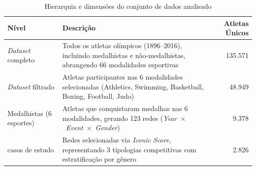 \begin{table}[htbp]
\centering
\caption{Hierarquia e dimensões do conjunto de dados analisado}
\label{tab:dataset_hierarchy}
\begin{tabular}{p{3.5cm}p{7cm}r}
\toprule
\textbf{Nível} & \textbf{Descrição} & \textbf{Atletas Únicos} \\
\midrule
\textit{Dataset} completo & Todos os atletas olímpicos (1896--2016), incluindo medalhistas e não-medalhistas, abrangendo 66 modalidades esportivas & 135.571 \\
\addlinespace[0.5em]
\textit{Dataset} filtrado & Atletas participantes nas 6 modalidades selecionadas (Athletics, Swimming, Basketball, Boxing, Football, Judo) & 48.949 \\
\addlinespace[0.5em]
Medalhistas (6 esportes) & Atletas que conquistaram medalhas nas 6 modalidades, gerando 123 redes \mbox{(\textit{Year} $\times$ \textit{Event} $\times$ \textit{Gender})} & 9.378 \\
\addlinespace[0.5em]
12 casos de estudo & Redes selecionadas via \textit{Iconic Score}, representando 3 tipologias competitivas com estratificação por gênero & 2.826 \\
\bottomrule
\end{tabular}
\end{table}
